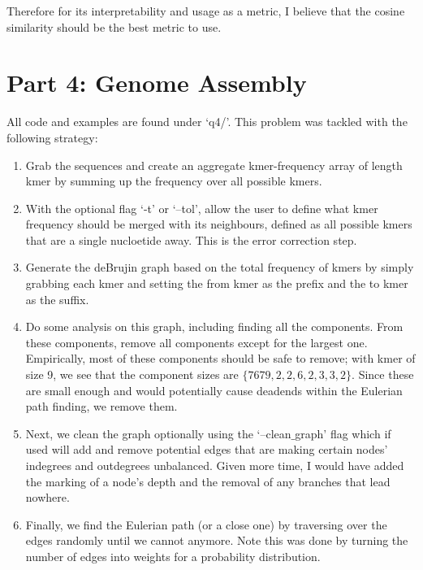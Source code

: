 \documentclass[10pt]{article}
\begin{document}
Therefore for its interpretability and usage as a metric, I believe that the cosine similarity should be the best metric to use.

\section*{Part 4: Genome Assembly}
All code and examples are found under `q4/'. This problem was tackled with the following strategy:
\begin{enumerate}
  \item Grab the sequences and create an aggregate kmer-frequency array of length kmer by summing up the frequency over all possible kmers.
  \item With the optional flag `-t' or `--tol', allow the user to define what kmer frequency should be merged with its neighbours, defined as all possible kmers that are a single nucloetide away. This is the error correction step.
  \item Generate the deBrujin graph based on the total frequency of kmers by simply grabbing each kmer and setting the from kmer as the prefix and the to kmer as the suffix.
  \item Do some analysis on this graph, including finding all the components. From these components, remove all components except for the largest one. Empirically, most of these components should be safe to remove; with kmer of size 9, we see that the component sizes are $\{7679, 2, 2, 6, 2, 3, 3, 2\}$. Since these are small enough and would potentially cause deadends within the Eulerian path finding, we remove them.
  \item Next, we clean the graph optionally using the `--clean$\_$graph' flag which if used will add and remove potential edges that are making certain nodes' indegrees and outdegrees unbalanced. Given more time, I would have added the marking of a node's depth and the removal of any branches that lead nowhere.
  \item Finally, we find the Eulerian path (or a close one) by traversing over the edges randomly until we cannot anymore. Note this was done by turning the number of edges into weights for a probability distribution.
\end{enumerate}
\end{document}
